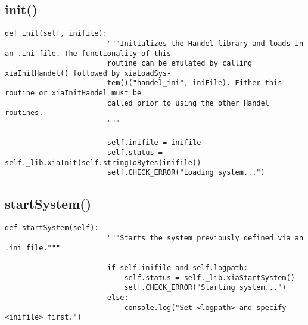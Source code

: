             \subsection{init()}
                \begin{lstlisting}[style=mypython, firstnumber=67, caption={[XMagix method init()]XMagix method init().}, label={lst:xmagix init}, gobble=16]
                    def init(self, inifile):
                        """Initializes the Handel library and loads in an .ini file. The functionality of this
                        routine can be emulated by calling xiaInitHandel() followed by xiaLoadSys-
                        tem()("handel_ini", iniFile). Either this routine or xiaInitHandel must be
                        called prior to using the other Handel routines.
                        """
                
                        self.inifile = inifile
                        self.status = self._lib.xiaInit(self.stringToBytes(inifile))
                        self.CHECK_ERROR("Loading system...")
                \end{lstlisting}
            
            \subsection{startSystem()}
                \begin{lstlisting}[style=mypython, firstnumber=84, caption={[XMagix method startSystem()]XMagix method startSystem().}, label={lst:xmagix startSystem}, gobble=16]
                    def startSystem(self):
                        """Starts the system previously defined via an .ini file."""

                        if self.inifile and self.logpath:
                            self.status = self._lib.xiaStartSystem()
                            self.CHECK_ERROR("Starting system...")
                        else:
                            console.log("Set <logpath> and specify <inifile> first.")
                \end{lstlisting}
            
